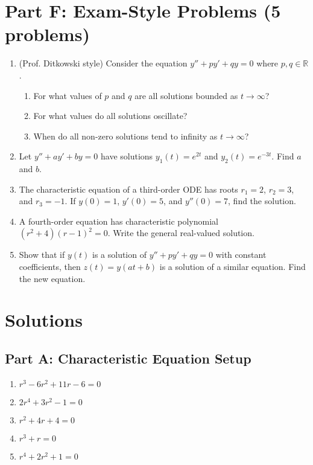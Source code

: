 \documentclass[12pt]{article}
\begin{document}
\section*{Part F: Exam-Style Problems (5 problems)}

\begin{enumerate}[resume]
\item (Prof. Ditkowski style) Consider the equation $y'' + py' + qy = 0$ where $p, q \in \mathbb{R}$.
\begin{enumerate}[label=(\alph*)]
    \item For what values of $p$ and $q$ are all solutions bounded as $t \to \infty$?
    \item For what values do all solutions oscillate?
    \item When do all non-zero solutions tend to infinity as $t \to \infty$?
\end{enumerate}

\item Let $y'' + ay' + by = 0$ have solutions $y_1(t) = e^{2t}$ and $y_2(t) = e^{-3t}$. Find $a$ and $b$.

\item The characteristic equation of a third-order ODE has roots $r_1 = 2$, $r_2 = 3$, and $r_3 = -1$. If $y(0) = 1$, $y'(0) = 5$, and $y''(0) = 7$, find the solution.

\item A fourth-order equation has characteristic polynomial $(r^2 + 4)(r - 1)^2 = 0$. Write the general real-valued solution.

\item Show that if $y(t)$ is a solution of $y'' + py' + qy = 0$ with constant coefficients, then $z(t) = y(at + b)$ is a solution of a similar equation. Find the new equation.
\end{enumerate}

\newpage

\section*{Solutions}

\subsection*{Part A: Characteristic Equation Setup}

\begin{enumerate}
\item $r^3 - 6r^2 + 11r - 6 = 0$

\item $2r^4 + 3r^2 - 1 = 0$

\item $r^2 + 4r + 4 = 0$

\item $r^3 + r = 0$

\item $r^4 + 2r^2 + 1 = 0$
\end{enumerate}
\end{document}
